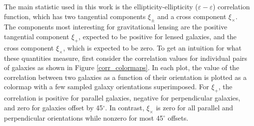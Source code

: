 \documentclass[%
 reprint,
 amsmath,amssymb,
 aps,nofootinbib
]{revtex4-1}
\begin{document}
The main statistic used in this work is the ellipticity-ellipticity ($\varepsilon-\varepsilon$) correlation function, which has two tangential components $\xi_\pm$ and a cross component $\xi_\times$. The components most interesting for gravitational lensing are the positive tangential component $\xi_+$, expected to be positive for lensed galaxies, and the cross component $\xi_\times$, which is expected to be zero. To get an intuition for what these quantities measure, first consider the correlation values for individual pairs of galaxies as shown in Figure \ref{corr_colormaps}. In each plot, the value of the correlation between two galaxies as a function of their orientation is plotted as a colormap with a few sampled galaxy orientations superimposed. For $\xi_+$, the correlation is positive for parallel galaxies, negative for perpendicular galaxies, and zero for galaxies offset by 45$^\circ$. In contrast, $\xi_\times$ is zero for all parallel and perpendicular orientations while nonzero for most 45$^\circ$ offsets. 
\end{document}
